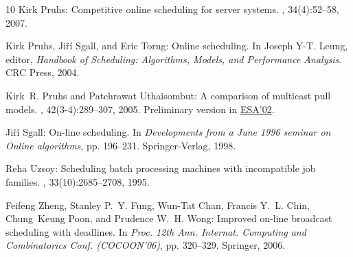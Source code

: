 \begin{thebibliography}{10}
{\sc Kirk Pruhs}: Competitive online scheduling for server systems.
, 34(4):52--58, 2007.
\newblock [\epfmtdoi{10.1145/1243401.1243411}]

{\sc Kirk Pruhs, Ji\v{r}\'{i} Sgall, and Eric Torng}: Online scheduling.
\newblock In {\sc Joseph Y-T. Leung}, editor, {\em Handbook of Scheduling:
  Algorithms, Models, and Performance Analysis}. CRC Press, 2004.

{\sc Kirk~R. Pruhs and Patchrawat Uthaisombut}: A comparison of multicast pull
  models.
, 42(3-4):289--307, 2005.
\newblock Preliminary version in
  \href{http://dx.doi.org/10.1007/3-540-45749-6\_70}{ESA'02}.
\newblock [\epfmtdoi{10.1007/s00453-005-1170-1}]

{\sc Ji\v{r}\'{i} Sgall}: On-line scheduling.
\newblock In {\em Developments from a June 1996 seminar on Online algorithms},
  pp. 196--231. Springer-Verlag, 1998.

{\sc Reha Uzsoy}: Scheduling batch processing machines with incompatible job
  families.
,
  33(10):2685--2708, 1995.
\newblock [\epfmtdoi{10.1080/00207549508904839}]

{\sc Feifeng Zheng, Stanley P.~Y. Fung, Wun-Tat Chan, Francis Y.~L. Chin,
  Chung~Keung Poon, and Prudence W.~H. Wong}: Improved on-line broadcast
  scheduling with deadlines.
\newblock In {\em Proc. 12th Ann. Internat. Computing and Combinatorics Conf.
  (COCOON'06)}, pp. 320--329. Springer, 2006.
\newblock [\epfmtdoi{10.1007/11809678\_34}]

\end{thebibliography}

